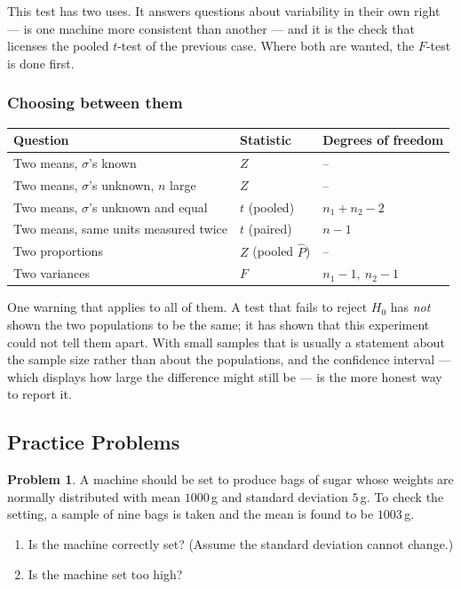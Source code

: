 \documentclass[11pt,a4paper]{article}
\theoremstyle{definition}
\newtheorem{problemx}{Problem}[section]
\newenvironment{problem}{\begin{problemx}}{\end{problemx}}
\begin{document}
This test has two uses. It answers questions about variability in their own right --- is one
machine more consistent than another --- and it is the check that licenses the pooled
$t$-test of the previous case. Where both are wanted, the $F$-test is done first.

\subsubsection{Choosing between them}
\begin{table}[H]
\centering
\begin{tabular}{lll}
Question & Statistic & Degrees of freedom\\
\hline
Two means, $\sigma$'s known & $Z$ & --\\
Two means, $\sigma$'s unknown, $n$ large & $Z$ & --\\
Two means, $\sigma$'s unknown and equal & $t$ (pooled) & $n_1+n_2-2$\\
Two means, same units measured twice & $t$ (paired) & $n-1$\\
Two proportions & $Z$ (pooled $\hat{P}$) & --\\
Two variances & $F$ & $n_1-1,\ n_2-1$\\
\end{tabular}
\end{table}

One warning that applies to all of them. A test that fails to reject $H_0$ has \emph{not}
shown the two populations to be the same; it has shown that this experiment could not tell
them apart. With small samples that is usually a statement about the sample size rather than
about the populations, and the confidence interval --- which displays how large the
difference might still be --- is the more honest way to report it.






\pagebreak
\subsection{Practice Problems}

\begin{problem}
A machine should be set to produce bags of sugar whose weights are normally distributed
with mean $1000$\,g and standard deviation $5$\,g. To check the setting, a sample of nine
bags is taken and the mean is found to be $1003$\,g.
\begin{enumerate}
\item[(a).] Is the machine correctly set? (Assume the standard deviation cannot change.)
\item[(b).] Is the machine set too high?
\end{enumerate}
\end{problem}
\end{document}
